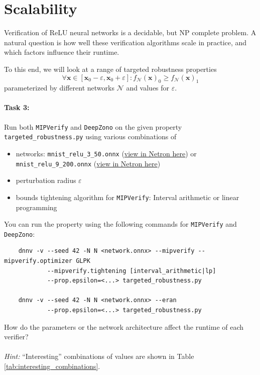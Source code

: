 \documentclass[11pt,fleqn]{article}
\let\vec\mathbf
\begin{document}
\section*{Scalability}

Verification of $\mathrm{ReLU}$ neural networks is a decidable, but NP complete problem.
A natural question is how well these verification algorithms scale in practice, and which factors influence their runtime.

To this end, we will look at a range of targeted robustness properties
\begin{equation*}
    \forall \vec{x} \in [\vec{x}_0 - \varepsilon, \vec{x}_0 + \varepsilon]: f_{\mathcal{N}}(\vec{x})_0 \geq f_{\mathcal{N}}(\vec{x})_1
\end{equation*}
parameterized by different networks $\mathcal{N}$ and values for $\varepsilon$.

\paragraph{Task 3:}
Run both \texttt{MIPVerify} and \texttt{DeepZono} on the given property \texttt{targeted\_robustness.py} using various combinations of 
\begin{itemize}
    \item networks: \texttt{mnist\_relu\_3\_50.onnx} 
     (\href{https://netron.app/?url=https://github.com/samysweb/nn-verification-101/blob/f1260815790301da1127bd085e3797108e0eeec4/provided/nets/mnist_relu_3_50.onnx}{view in Netron here})
    or \texttt{mnist\_relu\_9\_200.onnx}
    (\href{https://netron.app/?url=https://github.com/samysweb/nn-verification-101/blob/f1260815790301da1127bd085e3797108e0eeec4/provided/nets/mnist_relu_9_200.onnx}{view in Netron here})
    \item perturbation radius $\varepsilon$
    \item bounds tightening algorithm for \texttt{MIPVerify}: Interval arithmetic or linear programming
\end{itemize}
You can run the property using the following commands for \texttt{MIPVerify} and \texttt{DeepZono}:
\begin{verbatim}
    dnnv -v --seed 42 -N N <network.onnx> --mipverify --mipverify.optimizer GLPK 
            --mipverify.tightening [interval_arithmetic|lp] 
            --prop.epsilon=<...> targeted_robustness.py

    dnnv -v --seed 42 -N N <network.onnx> --eran 
            --prop.epsilon=<...> targeted_robustness.py
\end{verbatim}
How do the parameters or the network architecture affect the runtime of each verifier?
\\
\\
\textit{Hint:}
``Interesting'' combinations of values are shown in Table \ref{tab:interesting_combinations}.
\end{document}
